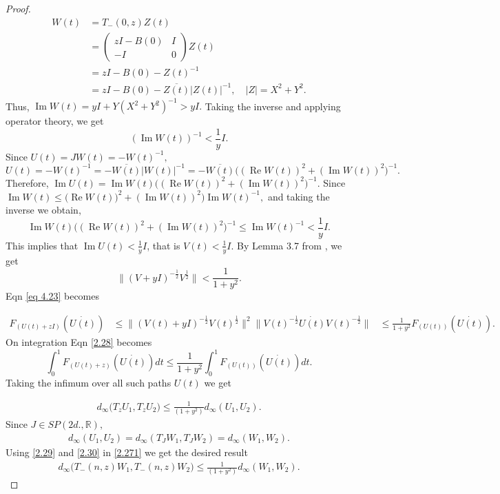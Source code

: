 \documentclass[reqno]{amsart}
\numberwithin{equation}{section}
\newcommand{\R}{\mathbb{R}}
\begin{document}
\begin{proof}
\begin{align*}
W(t) & =T_- (0, z)Z(t) \\ & = \begin{pmatrix} z I -B(0) &  I \\ - I  & 0 \end{pmatrix} Z(t) \\ & = zI -B(0)- Z(t)^{-1} \\ & = zI -B(0)- \overline{Z(t)} |Z(t)|^{-1},\quad |Z| = X^2 +Y^2  .\end{align*}
Thus, $ \operatorname{Im} W(t) = yI + Y(X^2+Y^2)^{-1} > yI .$
 Taking the inverse and applying operator theory, we get $$ ( \operatorname{Im} W(t))^{-1}< \frac{1}{y}I.$$ Since $U(t) = JW(t)= -W(t)^{-1}, $ $$ U(t) = -W(t)^{-1} = - \overline{W(t)} |W(t)|^{-1} = - \overline{W(t)} \Big(  ( \operatorname{Re} W(t))^2 + (\operatorname{Im} W(t))^2\Big)^{-1}.$$ Therefore, $ \operatorname{Im} U(t) =  \operatorname{Im} W(t) \Big(  ( \operatorname{Re} W(t))^2 + (\operatorname{Im} W(t))^2\Big)^{-1}.$  Since $ \operatorname{Im} W(t) \leq \Big( \operatorname{Re} W(t))^2 + (\operatorname{Im} W(t))^2\Big)\operatorname{Im} W(t)^{-1},$ and taking the inverse we obtain,
$$ \operatorname{Im} W(t) \Big(  ( \operatorname{Re} W(t))^2 + (\operatorname{Im} W(t))^2\Big)^{-1}  \leq \operatorname{Im} W(t)^{-1} < \frac{1}{y}I. $$ This implies that
$ \operatorname{Im} U(t)< \frac{1}{y} I $, that is $ V(t) < \frac{1}{y} I$.
By Lemma 3.7 from \cite{KM1}, we get  $$ \| (V+yI)^{- \frac{1}{2}} V^{\frac{1}{2}}\| < \frac{1}{1+y^2}.$$
Eqn \eqref{eq 4.23} becomes 

\begin{align}\label{2.28}
F_{(U(t) +zI)} ( \dot{U(t)}) & \leq \| (V(t) + yI)^{-\frac{1}{2}} V(t)^{\frac{1}{2}} \|^2 \| V(t)^{-\frac{1}{2}} \dot{U(t)} V(t)^{-\frac{1}{2}} \| & \leq \frac{1}{1+y^2} F_{(U(t))} ( \dot{U(t)}) .\end{align}
On integration  Eqn \eqref{2.28} becomes
$$ \int_0^1 F_{(U(t)+z)} ( \dot{U(t)}) dt \leq  \frac{1}{1+y^2} \int_0^1 F_{(U(t))} ( \dot{U(t)}) dt
.$$ Taking the infimum over all such paths $U(t) $ we get

\begin{align} \label {2.29}d_{\infty} \Big(T_{z} U_1, T_{z}  U_2 \Big) \leq \frac{1}{(1+ y^2) } d_{\infty}( U_1, U_2). \end{align}
Since $J \in SP(2d., \R), $  \begin{align} \label{2.30} d_{\infty}( U_1, U_2) = d_{\infty}( T_JW_1, T_JW_2) = d_{\infty}( W_1, W_2) .\end{align}
Using \eqref{2.29} and \eqref{2.30} in \eqref{2.271} we get the desired result
\begin{align*}  d_{\infty} \Big(T_{-}(n,z) W_1, T_{-} (n,z) W_2 \Big) \leq \frac{1}{(1+ y^2) } d_{\infty}( W_1, W_2). \end{align*}
\end{proof}
\end{document}

